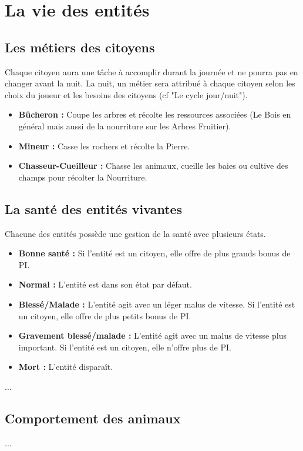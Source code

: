 \documentclass[a4paper]{article}
\begin{document}
\section*{La vie des entités}

\subsection*{Les métiers des citoyens}
Chaque citoyen aura une tâche à accomplir durant la journée et ne pourra pas en changer avant la nuit. La nuit, un métier sera attribué à chaque citoyen selon les choix du joueur et les besoins des citoyens (cf "Le cycle jour/nuit").
\begin{itemize}
\item \textbf{Bûcheron :} \small{ Coupe les arbres et récolte les ressources associées (Le Bois en général mais aussi de la nourriture sur les Arbres Fruitier).}
\item \textbf{Mineur :} \small{ Casse les rochers et récolte la Pierre.}
\item \textbf{Chasseur-Cueilleur :} \small{ Chasse les animaux, cueille les baies ou cultive des champs pour récolter la Nourriture.}
\end{itemize}

\subsection*{La santé des entités vivantes}
Chacune des entités possède une gestion de la santé avec plusieurs états.
\begin{itemize}
\item \textbf{Bonne santé :} \small{ Si l'entité est un citoyen, elle offre de plus grands bonus de PI.}
\item \textbf{Normal :} \small{ L'entité est dans son état par défaut.}
\item \textbf{Blessé/Malade :} \small{ L'entité agit avec un léger malus de vitesse. Si l'entité est un citoyen, elle offre de plus petits bonus de PI.}
\item \textbf{Gravement blessé/malade :} \small{ L'entité agit avec un malus de vitesse plus important. Si l'entité est un citoyen, elle n'offre plus de PI.}
\item \textbf{Mort :} \small{ L'entité disparaît.}
\end{itemize}

...

\subsection*{Comportement des animaux}
...
\end{document}
